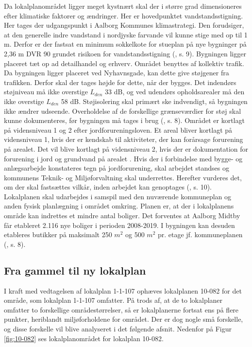Da lokalplanområdet ligger meget kystnært skal der i større grad dimensioneres efter klimatiske faktorer og ændringer. Her er hovedpunktet vandstandsstigning. Her tages der udgangspunkt i Aalborg Kommunes klimastrategi. Den forudsiger, at den generelle indre vandstand i nordjyske farvande vil kunne stige med op til 1 m. Derfor er der fastsat en minimum sokkelkote for stueplan på nye bygninger på 2,36 m DVR 90 grundet risikoen for vandstandsstigning (\citep{lokalplan}, s. 9).
\newline \indent{     }  Bygningen ligger placeret tæt op ad detailhandel og erhverv. Området benyttes af kollektiv trafik. Da bygningen ligger placeret ved Nyhavnsgade, kan dette give støjgener fra trafikken. Derfor skal der tages højde for dette, når der bygges. Det indendørs støjniveau må ikke overstige $L_{den}$ 33 dB, og ved udendørs opholdsarealer må den ikke overstige $L_{den}$ 58 dB. Støjisolering skal primært ske indvendigt, så bygningen ikke ændrer udseende. Overholdelse af de forskellige grænseværdier for støj skal kunne dokumenteres, før bygningen må tages i brug (\citep{lokalplan}, s. 8). Området er kortlagt på vidensniveau 1 og 2 efter jordforureningsloven. Et areal bliver kortlagt på vidensniveau 1, hvis der er kendskab til aktiviteter, der kan forårsage forurening på arealet. Det vil blive kortlagt på vidensniveau 2, hvis der er dokumentation for forurening i jord og grundvand på arealet \citep{vidensniveau}. Hvis der i forbindelse med bygge- og anlægsarbejde konstateres tegn på jordforurening, skal arbejdet standses og kommunens Teknik- og Miljøforvaltning skal underrettes. Herefter vurderes det, om der skal fastsættes vilkår, inden arbejdet kan genoptages (\citep{lokalplan}, s. 10).
\newline
\newline
Lokalplanen skal udarbejdes i samspil med den nuværende kommuneplan og anden fysisk planlægning i området omkring. Planen er, at der i lokalplanens område kan indrettes et mindre antal boliger. Det forventes at Aalborg Midtby får etableret 2.116 nye boliger i perioden 2008-2019. I bygningen kan desuden etableres butikker på maksimalt 250 $m^2$  og 500 $m^2$ pr. etage jf. kommuneplanen (\citep{lokalplan}, s. 8).

\subsection{Fra gammel til ny lokalplan}
I kraft med vedtagelsen af lokalplan 1-1-107 ophæves lokalplanen 10-082 for det område, som lokalplan 1-1-107 omfatter. På trods af, at de to lokalplaner omfatter to forskellige områdestørrelser, så er lokalplanerne fortsat ens på flere punkter, heriblandt miljøforholdene for området. Der er dog nogle små forskelle, og disse forskelle vil blive analyseret i det følgende afsnit. Nedenfor på Figur \ref{fig:10-082} ses lokalplanområdet for lokalplan 10-082.

